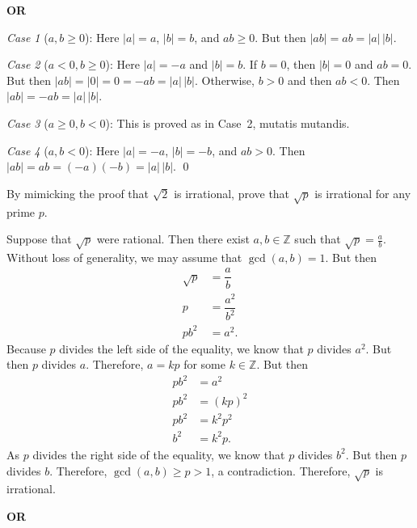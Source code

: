 \documentclass[11pt,letterpaper]{article}
\begin{document}
\begin{center} {\bfseries OR} \end{center}

\pf

\textit{Case 1} ($a, b \geq 0$): Here $|a|= a$, $|b|= b$, and $ab \geq 0$. But then $|ab|= ab = |a| \, |b|$. 

\textit{Case 2} ($a < 0, b \geq 0$): Here $|a|= -a$ and $|b|= b$. If $b= 0$, then $|b|= 0$ and $ab= 0$. But then $|ab|= |0|= 0 = -ab= |a| \,|b|$. Otherwise, $b > 0$ and then $ab < 0$. Then $|ab|= -ab= |a| \, |b|$. 

\textit{Case 3} ($a \geq 0, b < 0$): This is proved as in Case~2, mutatis mutandis.  

\textit{Case 4} ($a, b < 0$): Here $|a|= -a$, $|b|= -b$, and $ab > 0$. Then $|ab|= ab= (-a)(-b)= |a| \, |b|$. \qed \pspace





\newpage





 By mimicking the proof that $\sqrt{2}$ is irrational, prove that $\sqrt{p}$ is irrational for any prime $p$. \pspace

\sol Suppose that $\sqrt{p}$ were rational. Then there exist $a, b \in \mathbb{Z}$ such that $\sqrt{p}= \frac{a}{b}$. Without loss of generality, we may assume that $\gcd(a, b)= 1$. But then
	\[
	\begin{aligned}
	\sqrt{p}&= \dfrac{a}{b} \\
	p&= \dfrac{a^2}{b^2} \\
	pb^2&= a^2.
	\end{aligned}
	\]
Because $p$ divides the left side of the equality, we know that $p$ divides $a^2$. But then $p$ divides $a$. Therefore, $a= kp$ for some $k \in \mathbb{Z}$. But then
	\[
	\begin{aligned}
	pb^2&= a^2 \\
	pb^2&= (kp)^2 \\
	pb^2&= k^2p^2 \\
	b^2&= k^2p.
	\end{aligned}
	\]
As $p$ divides the right side of the equality, we know that $p$ divides $b^2$. But then $p$ divides $b$. Therefore, $\gcd(a, b) \geq p > 1$, a contradiction. Therefore, $\sqrt{p}$ is irrational. 

\begin{center} {\bfseries OR} \end{center}
\end{document}
